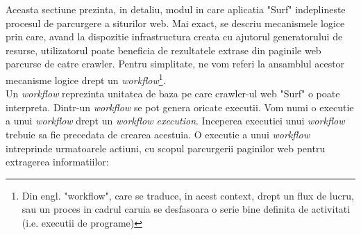 Aceasta sectiune prezinta, in detaliu, modul in care aplicatia "Surf" indeplineste procesul de parcurgere a siturilor web. Mai exact, se descriu mecanismele logice prin care, avand la dispozitie infrastructura creata cu ajutorul generatorului de resurse, utilizatorul poate beneficia de rezultatele extrase din paginile web parcurse de catre crawler. Pentru simplitate, ne vom referi la ansamblul acestor mecanisme logice drept un \textit{workflow}\footnote{Din engl. "workflow", care se traduce, in acest context, drept un flux de lucru, sau un proces in cadrul caruia se desfasoara o serie bine definita de activitati (i.e. executii de programe)}.
\\

Un \textit{workflow} reprezinta unitatea de baza pe care crawler-ul web "Surf" o poate interpreta. Dintr-un \textit{workflow} se pot genera oricate executii. Vom numi o executie a unui \textit{workflow} drept un \textit{workflow execution}. Inceperea executiei unui \textit{workflow} trebuie sa fie precedata de crearea acestuia. O executie a unui \textit{workflow} intreprinde urmatoarele actiuni, cu scopul parcurgerii paginilor web pentru extragerea informatiilor:

